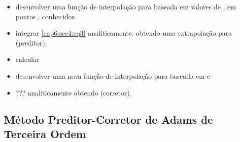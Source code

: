 \begin{itemize}

\item desenvolver uma função de interpolação para  baseada em valores de , em pontos , conhecidos.

\item integrar \ref{cap6:sec4:eq3} analiticamente, obtendo uma extrapolação para  (preditor).

\item calcular 

\item desenvolver uma nova função de interpolação para  baseada em  e 

\item ??? analiticamente obtendo  (corretor).

\end{itemize}

\subsection{Método Preditor-Corretor de Adams de Terceira Ordem}

